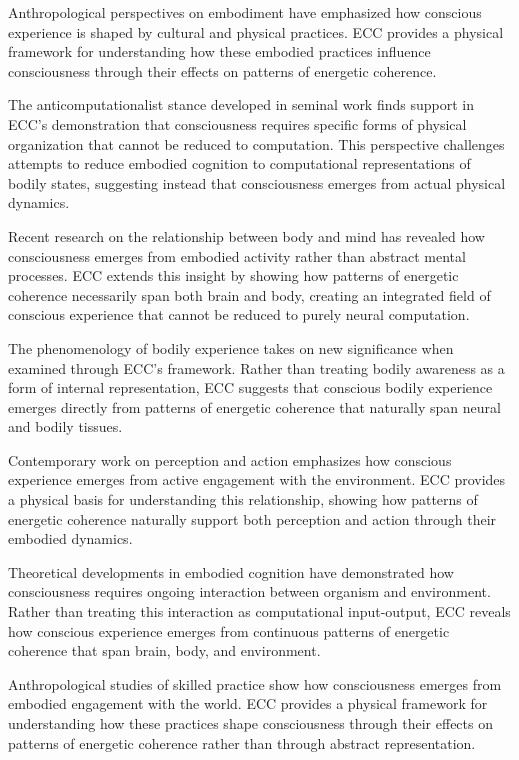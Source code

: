 Anthropological perspectives on embodiment \cite{Csordas1994} have emphasized how conscious experience is shaped by cultural and physical practices. ECC provides a physical framework for understanding how these embodied practices influence consciousness through their effects on patterns of energetic coherence.

The anticomputationalist stance developed in seminal work \cite{Dreyfus1992} finds support in ECC's demonstration that consciousness requires specific forms of physical organization that cannot be reduced to computation. This perspective challenges attempts to reduce embodied cognition to computational representations of bodily states, suggesting instead that consciousness emerges from actual physical dynamics.

Recent research on the relationship between body and mind \cite{Gallagher2005} has revealed how consciousness emerges from embodied activity rather than abstract mental processes. ECC extends this insight by showing how patterns of energetic coherence necessarily span both brain and body, creating an integrated field of conscious experience that cannot be reduced to purely neural computation.

The phenomenology of bodily experience \cite{Leder1990} takes on new significance when examined through ECC's framework. Rather than treating bodily awareness as a form of internal representation, ECC suggests that conscious bodily experience emerges directly from patterns of energetic coherence that naturally span neural and bodily tissues.

Contemporary work on perception and action \cite{Noe2004} emphasizes how conscious experience emerges from active engagement with the environment. ECC provides a physical basis for understanding this relationship, showing how patterns of energetic coherence naturally support both perception and action through their embodied dynamics.

Theoretical developments in embodied cognition \cite{Thompson2007} have demonstrated how consciousness requires ongoing interaction between organism and environment. Rather than treating this interaction as computational input-output, ECC reveals how conscious experience emerges from continuous patterns of energetic coherence that span brain, body, and environment.

Anthropological studies of skilled practice \cite{Marchand2010} show how consciousness emerges from embodied engagement with the world. ECC provides a physical framework for understanding how these practices shape consciousness through their effects on patterns of energetic coherence rather than through abstract representation.

